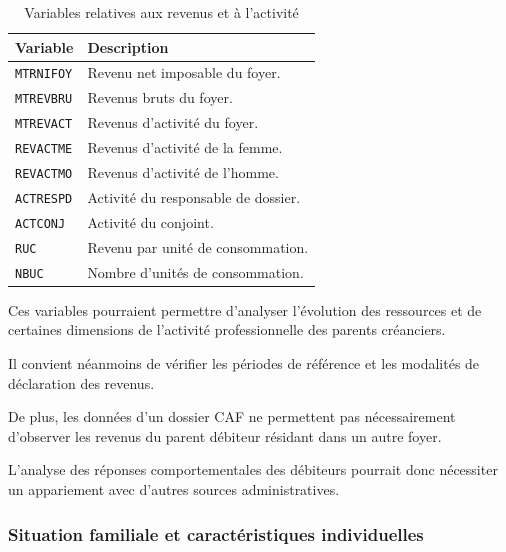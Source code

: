 \documentclass[11pt,a4paper]{article}
\begin{document}
\begin{table}[H]
\centering
\caption{Variables relatives aux revenus et à l'activité}
\small
\begin{tabular}{p{2.4cm}p{10.6cm}}
\toprule
\textbf{Variable} & \textbf{Description} \\
\midrule
\texttt{MTRNIFOY} &
Revenu net imposable du foyer. \\

\texttt{MTREVBRU} &
Revenus bruts du foyer. \\

\texttt{MTREVACT} &
Revenus d'activité du foyer. \\

\texttt{REVACTME} &
Revenus d'activité de la femme. \\

\texttt{REVACTMO} &
Revenus d'activité de l'homme. \\

\texttt{ACTRESPD} &
Activité du responsable de dossier. \\

\texttt{ACTCONJ} &
Activité du conjoint. \\

\texttt{RUC} &
Revenu par unité de consommation. \\

\texttt{NBUC} &
Nombre d'unités de consommation. \\
\bottomrule
\end{tabular}
\end{table}

Ces variables pourraient permettre
d'analyser l'évolution des ressources
et de certaines dimensions
de l'activité professionnelle
des parents créanciers.

Il convient néanmoins de vérifier
les périodes de référence
et les modalités de déclaration
des revenus.

De plus, les données d'un dossier
CAF ne permettent pas nécessairement
d'observer les revenus du parent
débiteur résidant dans un autre foyer.

L'analyse des réponses
comportementales des débiteurs
pourrait donc nécessiter
un appariement avec d'autres
sources administratives.

\subsubsection{Situation familiale et caractéristiques individuelles}
\end{document}

